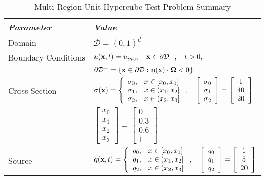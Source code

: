 \begin{table}[h]\caption{Multi-Region Unit Hypercube Test Problem Summary}
\label{tab:multi_region}
\centering
\begin{tabular}{l l}\toprule
\emph{Parameter} & \emph{Value}\\\midrule
Domain & $\mathcal{D} = (0,1)^d$\\
Boundary Conditions & $u(\mathbf{x},t)=u_{inc},\quad \mathbf{x}\in\partial\mathcal{D}^-,\quad t>0,$\\
   & $\partial\mathcal{D}^-=\{\mathbf{x}\in\partial\mathcal{D}:\mathbf{n}(\mathbf{x})
     \cdot\mathbf{\Omega}<0\}$\\
Cross Section & $\sigma(\mathbf{x})=\left\{\begin{array}{c l}
   \sigma_0, & x\in[x_0,x_1]\\
   \sigma_1, & x\in(x_1,x_2]\\
   \sigma_2, & x\in(x_2,x_3]
   \end{array}\right.,\quad
   \left[\begin{array}{c}\sigma_0\\\sigma_1\\\sigma_2\end{array}\right] =
      \left[\begin{array}{c}1\\40\\20\end{array}\right]$\\
   & $\left[\begin{array}{c}x_0\\x_1\\x_2\\x_3\end{array}\right] =
      \left[\begin{array}{c}0\\0.3\\0.6\\1\end{array}\right]$\\
Source & $q(\mathbf{x},t)=\left\{\begin{array}{c l}
   q_0, & x\in[x_0,x_1]\\
   q_1, & x\in(x_1,x_2]\\
   q_2, & x\in(x_2,x_3]
   \end{array}\right.,\quad
   \left[\begin{array}{c}q_0\\q_1\\q_2\end{array}\right] =
      \left[\begin{array}{c}1\\5\\20\end{array}\right]$\\

\end{tabular}
\end{table}
